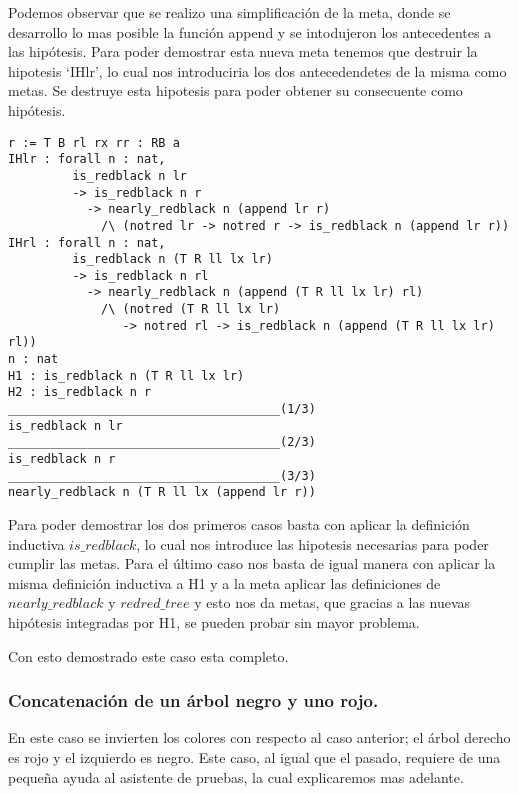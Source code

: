 Podemos observar que se realizo una simplificaci\'on de la meta, donde se desarrollo lo mas
posible la funci\'on append y se intodujeron los antecedentes a las hip\'otesis. Para poder
demostrar esta nueva meta tenemos que destruir la hipotesis `IHlr', lo cual nos introduciria los
dos antecedendetes de la misma como metas. Se destruye esta hipotesis para poder obtener su consecuente como hip\'otesis.

\begin{verbatim}
r := T B rl rx rr : RB a
IHlr : forall n : nat,
         is_redblack n lr
         -> is_redblack n r
           -> nearly_redblack n (append lr r)
             /\ (notred lr -> notred r -> is_redblack n (append lr r))
IHrl : forall n : nat,
         is_redblack n (T R ll lx lr)
         -> is_redblack n rl
           -> nearly_redblack n (append (T R ll lx lr) rl)
             /\ (notred (T R ll lx lr)
                -> notred rl -> is_redblack n (append (T R ll lx lr) rl))
n : nat
H1 : is_redblack n (T R ll lx lr)
H2 : is_redblack n r
______________________________________(1/3)
is_redblack n lr
______________________________________(2/3)
is_redblack n r
______________________________________(3/3)
nearly_redblack n (T R ll lx (append lr r))
\end{verbatim}

Para poder demostrar los dos primeros casos basta con aplicar la definici\'on inductiva
$is\_redblack$, lo cual nos introduce las hipotesis necesarias para poder cumplir las metas.
Para el \'ultimo caso nos basta de igual manera con aplicar la misma definici\'on inductiva a H1 y
a la meta aplicar las definiciones de $nearly\_redblack$ y $redred\_tree$ y esto nos da metas, que
gracias a las nuevas hip\'otesis integradas por H1, se pueden probar sin mayor problema.

Con esto demostrado este caso esta completo.

\subsubsection{Concatenaci\'on de un \'arbol negro y uno rojo.}

En este caso se invierten los colores con respecto al caso anterior; el \'arbol derecho es rojo y
el izquierdo es negro. Este caso, al igual que el pasado, requiere de una pequeña ayuda al
asistente de pruebas, la cual explicaremos mas adelante.

